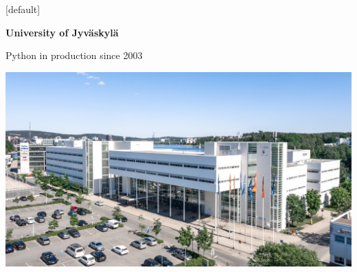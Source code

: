 \documentclass[12pt,aspectratio=169]{beamer}
\begin{document}
[default]
\begin{frame}
  \begin{minipage}{0.58\textwidth}
    \centering
    \huge \textbf{University of Jyväskylä}
    \par
    \vspace{0.5cm}
    \normalsize
    Python in production since 2003
  \end{minipage}
  \begin{minipage}{0.4\textwidth}
    \centering
    \vfill
    \includegraphics[height=\paperheight, trim=6cm 0cm 0cm 0cm, clip]{images/venue.jpg}
    \vfill
  \end{minipage}
\end{frame}

\end{document}
